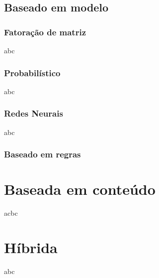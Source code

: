                             
            
            
    
    
    \subsection{Baseado em modelo}
    
        
        \subsubsection{Fatoração de matriz}
        abc
        
        \subsubsection{Probabilístico}
        abc
        
        \subsubsection{Redes Neurais}
        
        abc
        \subsubsection{Baseado em regras}
        

    
\section{Baseada em conteúdo}
acbc
        
\section{Híbrida}
    abc
    
